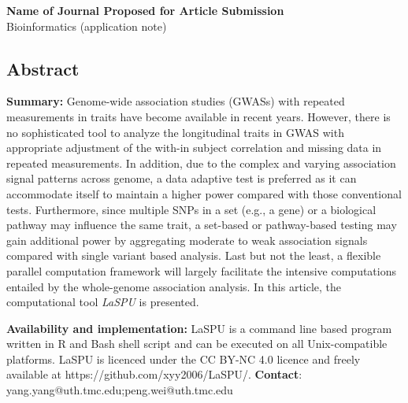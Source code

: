 \documentclass[12pt]{article}
\begin{document}
\textbf{Name of Journal Proposed for Article Submission}\\
Bioinformatics (application note)\\
\newpage
\subsection*{Abstract}
\textbf{Summary:} Genome-wide association studies (GWASs) with repeated measurements in traits have become available in recent years. However, there is no sophisticated tool to analyze the longitudinal traits in GWAS with appropriate adjustment of the with-in subject correlation and missing data in repeated measurements. In addition, due to the complex and varying association signal patterns across genome, a data adaptive test is preferred as it can accommodate itself to maintain a higher power compared with those conventional tests. Furthermore, since multiple SNPs in a set (e.g., a gene) or a biological pathway may influence the same trait, a set-based or pathway-based testing may gain additional power by aggregating moderate to weak association signals compared with single variant based analysis. Last but not the least, a flexible parallel computation framework will largely facilitate the intensive computations entailed by the whole-genome association analysis. In this article, the computational tool \textit{LaSPU} is presented.
 
\textbf{Availability and implementation:} LaSPU is a command line based program written in R and Bash shell script and can be executed on all Unix-compatible platforms. LaSPU is licenced under the CC BY-NC 4.0 licence and freely available at https://github.com/xyy2006/LaSPU/. 
\textbf{Contact}: yang.yang@uth.tmc.edu;peng.wei@uth.tmc.edu
\pagebreak 
\end{document}
